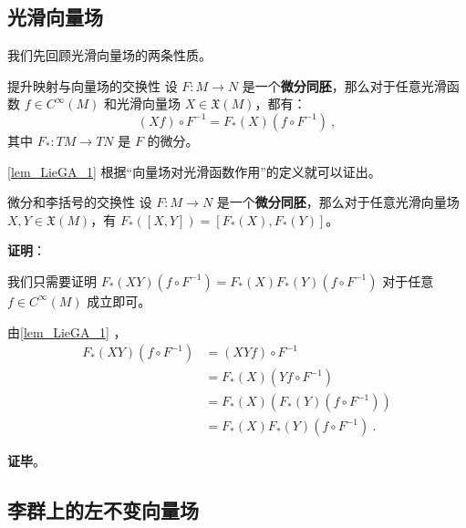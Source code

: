 

\subsection{光滑向量场}


我们先回顾光滑向量场的两条性质。

\begin{lemma}{提升映射与向量场的交换性}\label{lem_LieGA_1}
设 $F:M\to N$ 是一个\textbf{微分同胚}，那么对于任意光滑函数 $f\in C^{\infty}(M)$ 和光滑向量场 $X\in\mathfrak{X}(M)$，都有：
\begin{equation}\label{eq_LieGA_1}
(Xf)\circ F^{-1}=F_*(X)(f\circ F^{-1})~,
\end{equation}
其中 $F_*:TM\to TN$ 是 $F$ 的微分。
\end{lemma}

\autoref{lem_LieGA_1} 根据“向量场对光滑函数作用”的定义就可以证出。


\begin{lemma}{微分和李括号的交换性}\label{lem_LieGA_2}
设 $F:M\to N$ 是一个\textbf{微分同胚}，那么对于任意光滑向量场 $X, Y\in\mathfrak{X}(M)$，有 $F_*([X, Y])=[F_*(X), F_*(Y)]$。
\end{lemma}

\textbf{证明}：

我们只需要证明 $F_*(XY)(f\circ F^{-1})=F_*(X)F_*(Y)(f\circ F^{-1})$ 对于任意 $f\in C^{\infty}(M)$ 成立即可。

由\autoref{lem_LieGA_1} ，
\begin{equation}
\begin{aligned}
F_*(XY)(f\circ F^{-1})&=(XYf)\circ F^{-1}\\
&=F_*(X)(Yf\circ F^{-1})\\
&=F_*(X)(F_*(Y)(f\circ F^{-1}))\\
&=F_*(X)F_*(Y)(f\circ F^{-1})~.
\end{aligned}
\end{equation}

\textbf{证毕}。

\subsection{李群上的左不变向量场}

